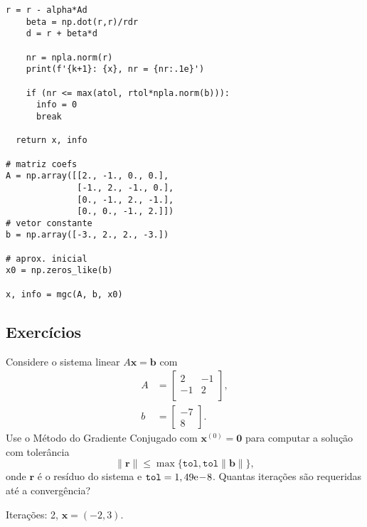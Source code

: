 \begin{ex}
\begin{lstlisting}[caption=mgc.py, label=cap_sislin_sec_metgc:cod:mgc.py]
    r = r - alpha*Ad
    beta = np.dot(r,r)/rdr
    d = r + beta*d

    nr = npla.norm(r)
    print(f'{k+1}: {x}, nr = {nr:.1e}')

    if (nr <= max(atol, rtol*npla.norm(b))):
      info = 0
      break

  return x, info
            
# matriz coefs
A = np.array([[2., -1., 0., 0.],
              [-1., 2., -1., 0.],
              [0., -1., 2., -1.],
              [0., 0., -1., 2.]])
# vetor constante
b = np.array([-3., 2., 2., -3.])

# aprox. inicial
x0 = np.zeros_like(b)

x, info = mgc(A, b, x0)
\end{lstlisting}

\end{ex}

\subsection{Exercícios}

\begin{exer}
  Considere o sistema linear $A\pmb{x} = \pmb{b}$ com
  \begin{align}
    A &=
    \begin{bmatrix}
      2 & -1\\
      -1 & 2\\
    \end{bmatrix},\\
    b &=
    \begin{bmatrix}
      -7\\
      8
    \end{bmatrix}.
  \end{align}
  Use o Método do Gradiente Conjugado com $\pmb{x}^{(0)} = \pmb{0}$ para computar a solução com tolerância
  \begin{equation}
    \|\pmb{r}\| \leq \max\{\texttt{tol}, \texttt{tol}\|\pmb{b}\|\},
  \end{equation}
  onde $\pmb{r}$ é o resíduo do sistema e $\texttt{tol} = 1,49\mathrm{e}\!-\!8$. Quantas iterações são requeridas até a convergência?
\end{exer}
\begin{resp}
  Iterações: 2, $\pmb{x} = (-2, 3)$.
\end{resp}

